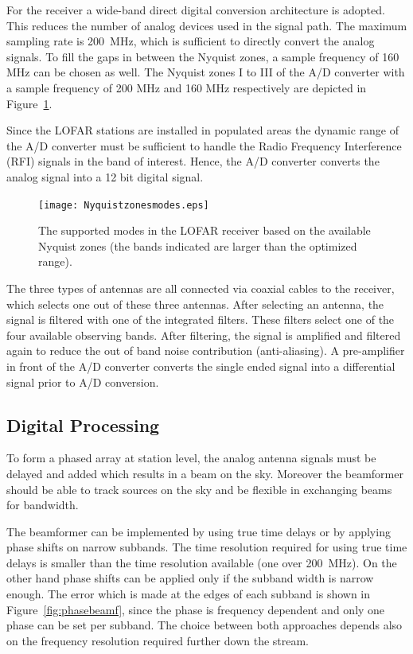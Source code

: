 \documentclass[journal]{IEEEtran}
\begin{document}
For the receiver a wide-band direct digital conversion architecture is adopted. This reduces the number of analog devices used in the signal path. The maximum sampling rate is 200~MHz, which is sufficient to directly convert the analog signals. To fill the gaps in between the Nyquist zones, a sample frequency of 160 MHz can be chosen as well. The Nyquist zones I to III of the A/D converter with a sample frequency of 200 MHz and 160 MHz respectively are depicted in Figure~\ref{fig:nyquistzones}. 

Since the LOFAR stations are installed in populated areas the dynamic range of the A/D converter must be sufficient to handle the Radio Frequency Interference (RFI) signals in the band of interest. Hence, the A/D converter converts the analog signal into a 12 bit digital signal. 

\begin{figure}
\begin{center}
\texttt{[image: Nyquistzonesmodes.eps]}
\end{center}
\caption{The supported modes in the LOFAR receiver based on the available Nyquist zones (the bands indicated are larger than the optimized range).}
\label{fig:nyquistzones}
\end{figure}

The three types of antennas are all connected via coaxial cables to the receiver, which selects one out of these three antennas. After selecting an antenna, the signal is filtered with one of the integrated filters. These filters select one of the four available observing bands. After filtering, the signal is amplified and filtered again to reduce the out of band noise contribution (anti-aliasing). A pre-amplifier in front of the A/D converter converts the single ended signal into a differential signal prior to A/D conversion. 

\subsection{Digital Processing}

To form a phased array at station level, the analog antenna signals must be delayed and added which results in a beam on the sky. Moreover the beamformer should be able to track sources on the sky and be flexible in exchanging beams for bandwidth. 

The beamformer can be implemented by using true time delays or by applying phase shifts on narrow subbands. The time resolution required for using true time delays is smaller than the time resolution available (one over 200~MHz). On the other hand phase shifts can be applied only if the subband width is narrow enough. The error which is made at the edges of each subband is shown in Figure~\ref{fig:phasebeamf}, since the phase is frequency dependent and only one phase can be set per subband. The choice between both approaches depends also on the frequency resolution required further down the stream.
\end{document}
